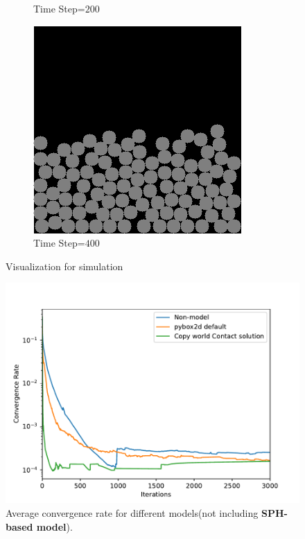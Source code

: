 \begin{figure}[!h]
\begin{subfigure}[b]{0.3\textwidth}
            \caption{Time Step=$200$}
        \end{subfigure}
        \begin{subfigure}[b]{0.3\textwidth}
            \includegraphics[width=\textwidth]{Figures/sim3.png}
            \caption{Time Step=$400$}
        \end{subfigure}
        \caption{Visualization for simulation}
        \label{fig:simvi}
    \end{figure}
    \begin{figure}[!h]
        \centering
        \includegraphics[width=\textwidth]{Figures/nosph}
        \caption{Average convergence rate for different models(not including \textbf{SPH-based model}).}
        \label{fg:nosph}
    \end{figure}
